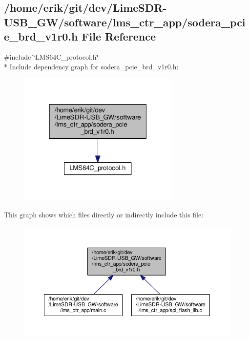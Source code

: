 \subsection{/home/erik/git/dev/\+Lime\+S\+D\+R-\/\+U\+S\+B\+\_\+\+G\+W/software/lms\+\_\+ctr\+\_\+app/sodera\+\_\+pcie\+\_\+brd\+\_\+v1r0.h File Reference}
\label{sodera__pcie__brd__v1r0_8h}
{\ttfamily \#include \char`\"{}L\+M\+S64\+C\+\_\+protocol.\+h\char`\"{}}\\*
Include dependency graph for sodera\+\_\+pcie\+\_\+brd\+\_\+v1r0.\+h\+:
\nopagebreak
\begin{figure}[H]
\begin{center}
\leavevmode
\includegraphics[width=229pt]{d6/dfb/sodera__pcie__brd__v1r0_8h__incl}
\end{center}
\end{figure}
This graph shows which files directly or indirectly include this file\+:
\nopagebreak
\begin{figure}[H]
\begin{center}
\leavevmode
\includegraphics[width=350pt]{da/d02/sodera__pcie__brd__v1r0_8h__dep__incl}
\end{center}
\end{figure}
